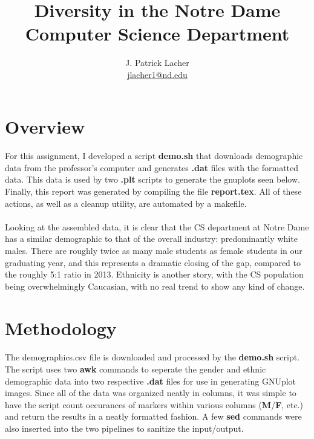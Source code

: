 \documentclass{article}
\title{Diversity in the Notre Dame Computer Science Department}
\author {J. Patrick Lacher \\ \href{mailto:jlacher1@nd.edu}{jlacher1@nd.edu}}
\begin{document}
	\maketitle
	
	\section{Overview}
	
	\paragraph{}
	For this assignment, I developed a script \textbf{demo.sh} that downloads demographic data from the professor's computer and generates \textbf{.dat} files with the formatted data. This data is used by two \textbf{.plt} scripts to generate the gnuplots seen below. Finally, this report was generated by compiling the file \textbf{report.tex}. All of these actions, as well as a cleanup utility, are automated by a makefile.
	\paragraph{}
	Looking at the assembled data, it is clear that the CS department at Notre Dame has a similar demographic to that of the overall industry: predominantly white males. There are roughly twice as many male students as female students in our graduating year, and this represents a dramatic closing of the gap, compared to the roughly 5:1 ratio in 2013. Ethnicity is another story, with the CS population being overwhelmingly Caucasian, with no real trend to show any kind of change.
	
	\section{Methodology}
	
	\paragraph{}
	The demographics.csv file is downloaded and processed by the \textbf{demo.sh} script. The script uses two \textbf{awk} commands to seperate the gender and ethnic demographic data into two respective \textbf{.dat} files for use in generating GNUplot images. Since all of the data was organized neatly in columns, it was simple to have the script count occurances of markers within various columns (\textbf{M}/\textbf{F}, etc.) and return the results in a neatly formatted fashion. A few \textbf{sed} commands were also inserted into the two pipelines to sanitize the input/output.
\end{document}
